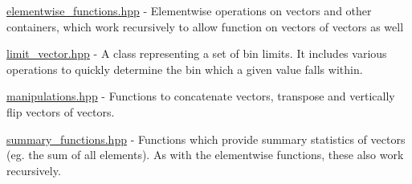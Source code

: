 \begin{DoxyItemize}
\item \hyperlink{elementwise__functions_8hpp}{elementwise\+\_\+functions.\+hpp} -\/ Elementwise operations on vectors and other containers, which work recursively to allow function on vectors of vectors as well
\item \hyperlink{limit__vector_8hpp}{limit\+\_\+vector.\+hpp} -\/ A class representing a set of bin limits. It includes various operations to quickly determine the bin which a given value falls within.
\item \hyperlink{manipulations_8hpp}{manipulations.\+hpp} -\/ Functions to concatenate vectors, transpose and vertically flip vectors of vectors.
\item \hyperlink{summary__functions_8hpp}{summary\+\_\+functions.\+hpp} -\/ Functions which provide summary statistics of vectors (eg. the sum of all elements). As with the elementwise functions, these also work recursively. 
\end{DoxyItemize}
